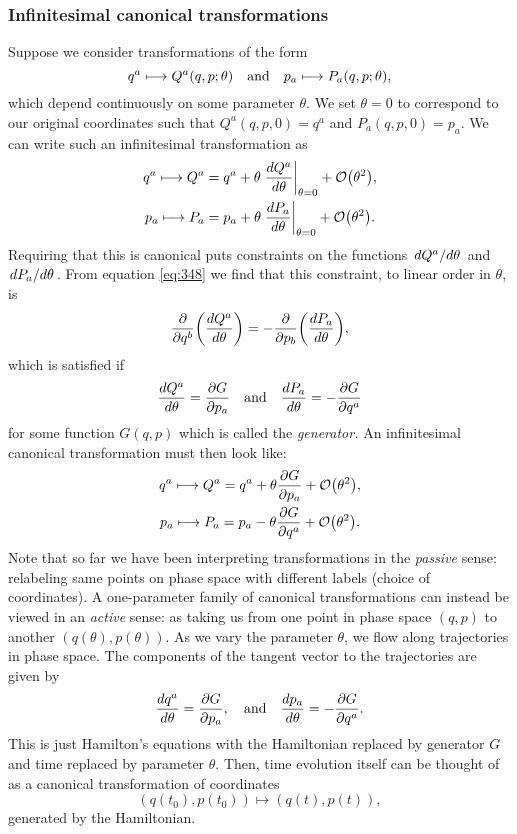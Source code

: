 \documentclass{article}
\begin{document}
\subsubsection{Infinitesimal canonical transformations}
Suppose we consider transformations of the form
\begin{equation}
	q^{a} \longmapsto Q^{a} (q,p; \theta) \qq{and} p_{a} \longmapsto P_{a} (q, p; \theta),
\end{equation}
which depend continuously on some parameter $ \theta $. We set $ \theta = 0 $ to correspond to our original coordinates such that $ Q^{a}(q,p,0) = q^{a} $ and $ P_{a}(q,p,0) = p_{a} $. We can write such an infinitesimal transformation as
\begin{gather}
	q^{a} \longmapsto Q^{a} = q^{a} + \theta \eval{\dv{Q^{a}}{\theta}}_{\theta = 0} + \order{\theta^{2}}, \\
	p_{a} \longmapsto P_{a} = p_{a} + \theta \eval{\dv{P_{a}}{\theta}}_{\theta = 0} + \order{\theta^{2}}.
\end{gather}
Requiring that this is canonical puts constraints on the functions $ \dv*{Q^{a}}{\theta} $ and $ \dv*{P_{a}}{\theta} $. From equation \eqref{eq:348} we find that this constraint, to linear order in $ \theta $, is
\begin{equation}
	\pdv{q^{b}}(\dv{Q^{a}}{\theta}) = - \pdv{p_{b}}(\dv{P_{a}}{\theta}),
\end{equation}
which is satisfied if
\begin{equation}
	\dv{Q^{a}}{\theta} = \pdv{G}{p_{a}} \qq{and} \dv{P_{a}}{\theta}= -\pdv{G}{q^{a}}
\end{equation}
for some function $ G(q,p) $ which is called the \textit{generator.} An infinitesimal canonical transformation must then look like:
\begin{gather}
q^{a} \longmapsto Q^{a} = q^{a} + \theta \pdv{G}{p_{a}} + \order{\theta^{2}}, \\
p_{a} \longmapsto P_{a} = p_{a} - \theta \pdv{G}{q^{a}} + \order{\theta^{2}}.
\end{gather}
Note that so far we have been interpreting transformations in the \textit{passive} sense: relabeling same points on phase space with different labels (choice of coordinates). A one-parameter family of canonical transformations can instead be viewed in an \textit{active} sense: as taking us from one point in phase space $(q,p)$ to another $ (q(\theta), p(\theta)) $. As we vary the parameter $ \theta $, we flow along trajectories in phase space. The components of the tangent vector to the trajectories are given by
\begin{equation}
	\dv{q^{a}}{\theta} = \pdv{G}{p_{a}}, \qq{and} \dv{p_{a}}{\theta} = -\pdv{G}{q^{a}}.
\end{equation}
This is just Hamilton's equations with the Hamiltonian replaced by generator $ G $ and time replaced by parameter $ \theta $. Then, time evolution itself can be thought of as a canonical transformation of coordinates
\[
	(q(t_{0}), p(t_{0})) \longmapsto (q(t), p(t)),
\]
generated by the Hamiltonian.
\end{document}
